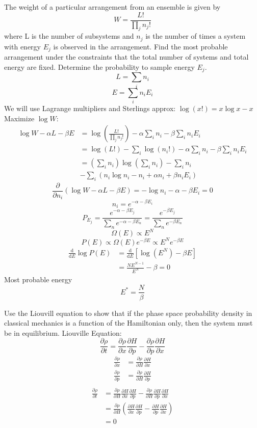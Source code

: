 \documentclass[letterpaper]{article}
\def\d{\mathrm{d}}
\begin{document}
\begin{multicols}{2}
The weight of a particular arrangement from an ensemble is given by
\[
W=\frac{L!}{\prod_jn_j!}
\]
where L is the number of subsystems and $n_j$ is the number of times a system
with energy $E_j$ is observed in the arrangement. Find the most probable
arrangement under the constraints that the total number of systems and total
energy are fixed. Determine the probability to sample energy $E_j$.
\[
L=\sum_in_i
\]
\[
E=\sum_in_iE_i
\]
We will use Lagrange multipliers and Sterlings approx: $\log(x!)=x\log x-x$
Maximize $\log W$:
\begin{align*}
\log W-\alpha L-\beta E&=\log\left(\frac{L!}{\prod_jn_j!}\right)
-\alpha\sum_in_i-\beta\sum_in_iE_i\\
&=\log(L!)-\sum_i\log(n_i!)-\alpha\sum_in_i-\beta\sum_in_iE_i\\
&=\left(\sum_in_i\right)\log\left(\sum_in_i\right)-\sum_in_i\\
&-\sum_i\left(n_i\log n_i-n_i+\alpha n_i+\beta n_iE_i\right)
\end{align*}
\[
\frac{\partial}{\partial n_i}(\log W-\alpha L-\beta E)
=-\log n_i-\alpha-\beta E_i=0
\]
\[
n_i=e^{-\alpha-\beta E_i}
\]
\[
P_{E_j}=\frac{e^{-\alpha-\beta E_j}}{\sum_ne^{-\alpha-\beta E_n}}
=\frac{e^{-\beta E_j}}{\sum_ne^{-\beta E_n}}
\]
\[
\Omega(E)\propto E^N
\]
\[
P(E)\propto\Omega(E)e^{-\beta E}\propto E^Ne^{-\beta E}
\]
\begin{align*}
\frac{\d}{\d E}\log P(E)&=\frac{\d}{\d E}\left[\log(E^N)-\beta E\right]\\
&=\frac{NE^{N-1}}{E^N}-\beta=0
\end{align*}
Most probable energy
\[
E^*=\frac{N}{\beta}
\]

 Use the Liouvill equation to show that if the phase space
probability density in classical mechanics is a function of the Hamiltonian
only, then the system must be in equilibrium.
 Liouville Equation:
\[
\frac{\partial\rho}{\partial t}=\frac{\partial\rho}{\partial x}
\frac{\partial H}{\partial p}-\frac{\partial\rho}{\partial p}
\frac{\partial H}{\partial x}
\]
\begin{align*}
\frac{\partial\rho}{\partial x}&=\frac{\partial\rho}{\partial H}
\frac{\partial H}{\partial x}\\
\frac{\partial\rho}{\partial p}&=\frac{\partial\rho}{\partial H}
\frac{\partial H}{\partial p}\\
\end{align*}
\begin{align*}
\frac{\partial\rho}{\partial t}&=\frac{\partial\rho}{\partial H}
\frac{\partial H}{\partial x}\frac{\partial H}{\partial p}
-\frac{\partial\rho}{\partial H}
\frac{\partial H}{\partial p}\frac{\partial H}{\partial x}\\
&=\frac{\partial\rho}{\partial H}\left(
\frac{\partial H}{\partial x}\frac{\partial H}{\partial p}
-\frac{\partial H}{\partial p}\frac{\partial H}{\partial x}\right)\\
&=0
\end{align*}


\end{multicols}
\end{document}

